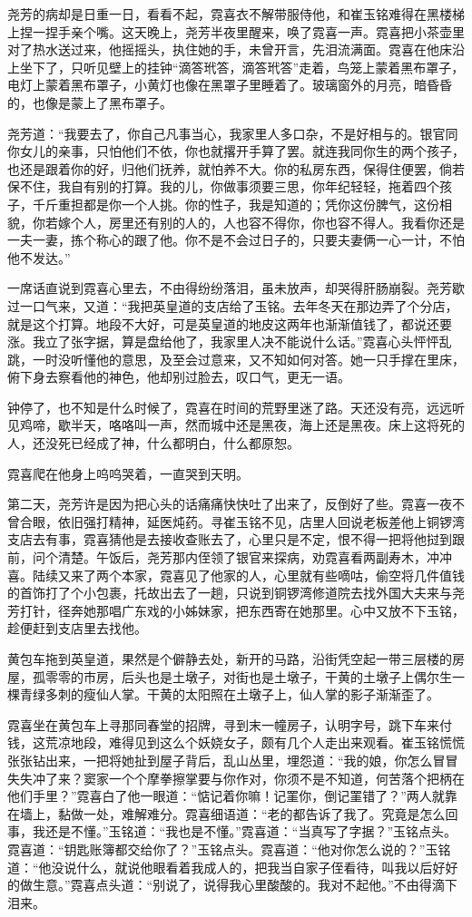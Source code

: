 \par 尧芳的病却是日重一日，看看不起，霓喜衣不解带服侍他，和崔玉铭难得在黑楼梯上捏一捏手亲个嘴。这天晚上，尧芳半夜里醒来，唤了霓喜一声。霓喜把小茶壶里对了热水送过来，他摇摇头，执住她的手，未曾开言，先泪流满面。霓喜在他床沿上坐下了，只听见壁上的挂钟“滴答玳答，滴答玳答”走着，鸟笼上蒙着黑布罩子，电灯上蒙着黑布罩子，小黄灯也像在黑罩子里睡着了。玻璃窗外的月亮，暗昏昏的，也像是蒙上了黑布罩子。
\par 尧芳道：“我要去了，你自己凡事当心，我家里人多口杂，不是好相与的。银官同你女儿的亲事，只怕他们不依，你也就撂开手算了罢。就连我同你生的两个孩子，也还是跟着你的好，归他们抚养，就怕养不大。你的私房东西，保得住便罢，倘若保不住，我自有别的打算。我的儿，你做事须要三思，你年纪轻轻，拖着四个孩子，千斤重担都是你一个人挑。你的性子，我是知道的；凭你这份脾气，这份相貌，你若嫁个人，房里还有别的人的，人也容不得你，你也容不得人。我看你还是一夫一妻，拣个称心的跟了他。你不是不会过日子的，只要夫妻俩一心一计，不怕他不发达。”
\par 一席话直说到霓喜心里去，不由得纷纷落泪，虽未放声，却哭得肝肠崩裂。尧芳歇过一口气来，又道：“我把英皇道的支店给了玉铭。去年冬天在那边弄了个分店，就是这个打算。地段不大好，可是英皇道的地皮这两年也渐渐值钱了，都说还要涨。我立了张字据，算是盘给他了，我家里人决不能说什么话。”霓喜心头怦怦乱跳，一时没听懂他的意思，及至会过意来，又不知如何对答。她一只手撑在里床，俯下身去察看他的神色，他却别过脸去，叹口气，更无一语。
\par 钟停了，也不知是什么时候了，霓喜在时间的荒野里迷了路。天还没有亮，远远听见鸡啼，歇半天，咯咯叫一声，然而城中还是黑夜，海上还是黑夜。床上这将死的人，还没死已经成了神，什么都明白，什么都原恕。
\par 霓喜爬在他身上呜呜哭着，一直哭到天明。
\par 第二天，尧芳许是因为把心头的话痛痛快快吐了出来了，反倒好了些。霓喜一夜不曾合眼，依旧强打精神，延医炖药。寻崔玉铭不见，店里人回说老板差他上铜锣湾支店去有事，霓喜猜他是去接收查账去了，心里只是不定，恨不得一把将他挝到跟前，问个清楚。午饭后，尧芳那内侄领了银官来探病，劝霓喜看两副寿木，冲冲喜。陆续又来了两个本家，霓喜见了他家的人，心里就有些嘀咕，偷空将几件值钱的首饰打了个小包裹，托故出去了一趟，只说到铜锣湾修道院去找外国大夫来与尧芳打针，径奔她那唱广东戏的小姊妹家，把东西寄在她那里。心中又放不下玉铭，趁便赶到支店里去找他。
\par 黄包车拖到英皇道，果然是个僻静去处，新开的马路，沿街凭空起一带三层楼的房屋，孤零零的市房，后头也是土墩子，对街也是土墩子，干黄的土墩子上偶尔生一棵青绿多刺的瘦仙人掌。干黄的太阳照在土墩子上，仙人掌的影子渐渐歪了。
\par 霓喜坐在黄包车上寻那同春堂的招牌，寻到末一幢房子，认明字号，跳下车来付钱，这荒凉地段，难得见到这么个妖娆女子，颇有几个人走出来观看。崔玉铭慌慌张张钻出来，一把将她扯到屋子背后，乱山丛里，埋怨道：“我的娘，你怎么冒冒失失冲了来？窦家一个个摩拳擦掌要与你作对，你须不是不知道，何苦落个把柄在他们手里？”霓喜白了他一眼道：“惦记着你嘛！记罣你，倒记罣错了？”两人就靠在墙上，黏做一处，难解难分。霓喜细语道：“老的都告诉了我了。究竟是怎么回事，我还是不懂。”玉铭道：“我也是不懂。”霓喜道：“当真写了字据？”玉铭点头。霓喜道：“钥匙账簿都交给你了？”玉铭点头。霓喜道：“他对你怎么说的？”玉铭道：“他没说什么，就说他眼看着我成人的，把我当自家子侄看待，叫我以后好好的做生意。”霓喜点头道：“别说了，说得我心里酸酸的。我对不起他。”不由得滴下泪来。
